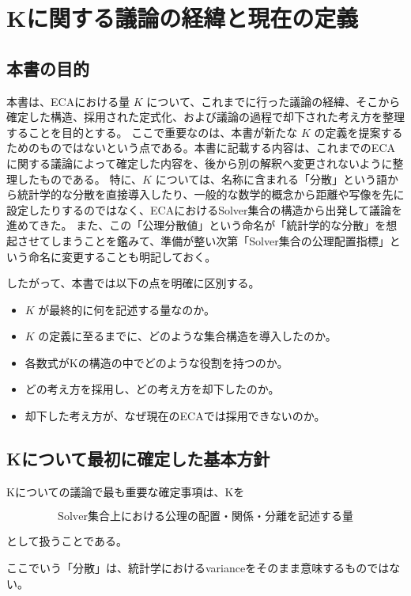 \section{Kに関する議論の経緯と現在の定義}

\subsection{本書の目的}

本書は、ECAにおける量 $K$ について、これまでに行った議論の経緯、そこから確定した構造、採用された定式化、および議論の過程で却下された考え方を整理することを目的とする。
ここで重要なのは、本書が新たな $K$ の定義を提案するためのものではないという点である。本書に記載する内容は、これまでのECAに関する議論によって確定した内容を、後から別の解釈へ変更されないように整理したものである。
特に、$K$ については、名称に含まれる「分散」という語から統計学的な分散を直接導入したり、一般的な数学的概念から距離や写像を先に設定したりするのではなく、ECAにおけるSolver集合の構造から出発して議論を進めてきた。
また、この「公理分散値」という命名が「統計学的な分散」を想起させてしまうことを鑑みて、準備が整い次第「Solver集合の公理配置指標」という命名に変更することも明記しておく。

したがって、本書では以下の点を明確に区別する。

\begin{itemize}
\item $K$ が最終的に何を記述する量なのか。
\item $K$ の定義に至るまでに、どのような集合構造を導入したのか。
\item 各数式がKの構造の中でどのような役割を持つのか。
\item どの考え方を採用し、どの考え方を却下したのか。
\item 却下した考え方が、なぜ現在のECAでは採用できないのか。
\end{itemize}

\subsection{Kについて最初に確定した基本方針}

Kについての議論で最も重要な確定事項は、Kを

\[
\boxed{
\text{Solver集合上における公理の配置・関係・分離を記述する量}
}
\]

として扱うことである。

ここでいう「分散」は、統計学におけるvarianceをそのまま意味するものではない。

